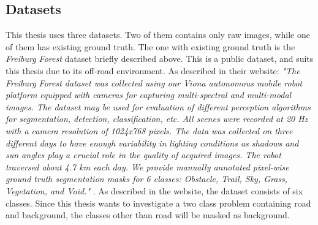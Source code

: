 \documentclass[USenglish]{ifimaster}  %
\begin{document}
\subsection{Datasets}
This thesis uses three datasets. Two of them contains only raw images, while one of them has existing ground truth. The one with existing ground truth is the \textit{Freiburg Forest} dataset briefly described above. This is a public dataset, and suits this thesis due to its off-road environment. As described in their website:
\newline
\newline
\textit{"The Freiburg Forest dataset was collected using our Viona autonomous mobile robot platform equipped with cameras for capturing multi-spectral and multi-modal images. The dataset may be used for evaluation of different perception algorithms for segmentation, detection, classification, etc. All scenes were recorded at 20 Hz with a camera resolution of 1024x768 pixels. The data was collected on three different days to have enough variability in lighting conditions as shadows and sun angles play a crucial role in the quality of acquired images. The robot traversed about 4.7 km each day. We provide manually annotated pixel-wise ground truth segmentation masks for 6 classes: Obstacle, Trail, Sky, Grass, Vegetation, and Void."} \cite{website:deepscene_freiburg_forest_website}. 
\newline
\newline
As described in the website, the dataset consists of six classes. Since this thesis wants to investigate a two class problem containing road and background, the classes other than road will be masked as background.
\end{document}
